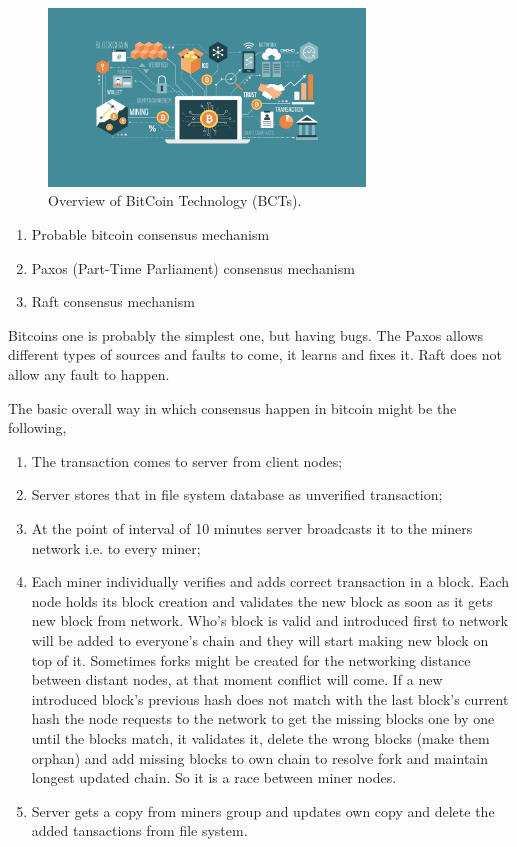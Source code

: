 \begin{figure}
\begin{center}
\includegraphics[width=0.75\textwidth]{./img_src/bitcoin.jpg}
\end{center}
\caption{Overview of BitCoin Technology (BCTs).}
\end{figure}

\begin{enumerate}
\item Probable bitcoin consensus mechanism
\item Paxos (Part-Time Parliament) consensus mechanism~\cite{paxos_made_easy, paxos_made_practical}
\item Raft consensus mechanism~\cite{raft_extd}
\end{enumerate}

Bitcoins one is probably the simplest one, but having bugs. The Paxos allows different types of sources and faults to come, it learns and fixes it. Raft does not allow any fault to happen.

The basic overall way in which consensus happen in bitcoin might be the following,

\begin{enumerate}
\item The transaction comes to server from client nodes;
\item Server stores that in file system database as unverified transaction;
\item At the point of interval of 10 minutes server broadcasts it to the miners network i.e. to every miner;
\item Each miner individually verifies and adds correct transaction in a block. Each node holds its block creation and validates the new block as soon as it gets new block from network. Who's block is valid and introduced first to network will be added to everyone's chain and they will start making new block on top of it. Sometimes forks might be created for the networking distance between distant nodes, at that moment conflict will come. If a new introduced block's previous hash does not match with the last block's current hash the node requests to the network to get the missing blocks one by one until the blocks match, it validates it, delete the wrong blocks (make them orphan) and add missing blocks to own chain to resolve fork and maintain longest updated chain. So it is a race between miner nodes.
\item Server gets a copy from miners group and updates own copy and delete the added tansactions from file system.
\end{enumerate}

